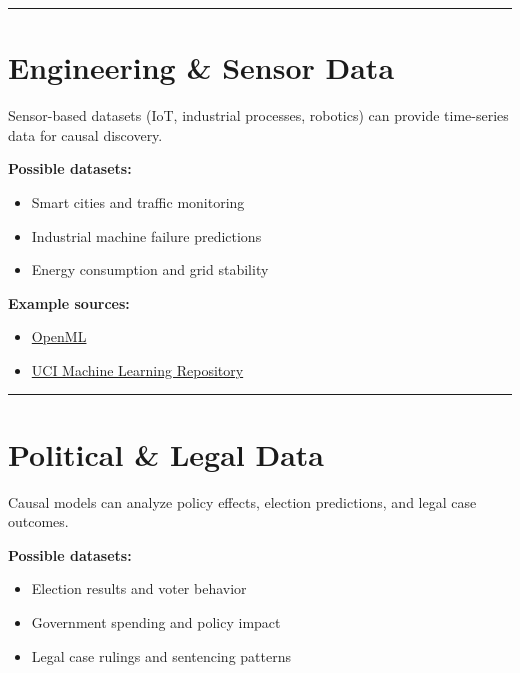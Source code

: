 \documentclass[
  letterpaper,
  DIV=11,
  numbers=noendperiod]{scrreprt}
\begin{document}
\begin{center}\rule{0.5\linewidth}{0.5pt}\end{center}

\section{\texorpdfstring{\textbf{Engineering \& Sensor
Data}}{Engineering \& Sensor Data}}\label{engineering-sensor-data}

Sensor-based datasets (IoT, industrial processes, robotics) can provide
time-series data for causal discovery.

\textbf{Possible datasets:}

\begin{itemize}
\item
  Smart cities and traffic monitoring
\item
  Industrial machine failure predictions
\item
  Energy consumption and grid stability
\end{itemize}

\textbf{Example sources:}

\begin{itemize}
\item
  \href{https://www.openml.org/}{OpenML}
\item
  \href{https://archive.ics.uci.edu/ml/index.php}{UCI Machine Learning
  Repository}
\end{itemize}

\begin{center}\rule{0.5\linewidth}{0.5pt}\end{center}

\section{\texorpdfstring{\textbf{Political \& Legal
Data}}{Political \& Legal Data}}\label{political-legal-data}

Causal models can analyze policy effects, election predictions, and
legal case outcomes.

\textbf{Possible datasets:}

\begin{itemize}
\item
  Election results and voter behavior
\item
  Government spending and policy impact
\item
  Legal case rulings and sentencing patterns
\end{itemize}
\end{document}
